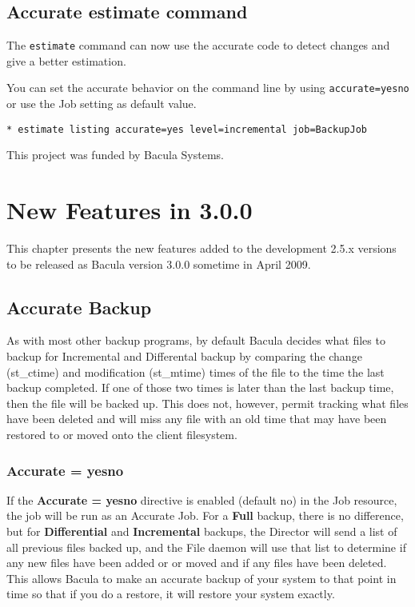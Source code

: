 \section{Accurate estimate command}

The \texttt{estimate} command can now use the accurate code to detect changes
and give a better estimation.

You can set the accurate behavior on the command line by using
\texttt{accurate=yes\vb{}no} or use the Job setting as default value.

\begin{verbatim}
* estimate listing accurate=yes level=incremental job=BackupJob
\end{verbatim}

This project was funded by Bacula Systems.

\chapter{New Features in 3.0.0}
\label{NewFeaturesChapter}

This chapter presents the new features added to the development 2.5.x
versions to be released as Bacula version 3.0.0 sometime in April 2009.

\section{Accurate Backup}

As with most other backup programs, by default Bacula decides what files to
backup for Incremental and Differental backup by comparing the change
(st\_ctime) and modification (st\_mtime) times of the file to the time the last
backup completed.  If one of those two times is later than the last backup
time, then the file will be backed up.  This does not, however, permit tracking
what files have been deleted and will miss any file with an old time that may
have been restored to or moved onto the client filesystem.

\subsection{Accurate = \lt{}yes\vb{}no\gt{}}
If the {\bf Accurate = \lt{}yes\vb{}no\gt{}} directive is enabled (default no) in
the Job resource, the job will be run as an Accurate Job. For a {\bf Full}
backup, there is no difference, but for {\bf Differential} and {\bf
  Incremental} backups, the Director will send a list of all previous files
backed up, and the File daemon will use that list to determine if any new files
have been added or or moved and if any files have been deleted. This allows
Bacula to make an accurate backup of your system to that point in time so that
if you do a restore, it will restore your system exactly.  

